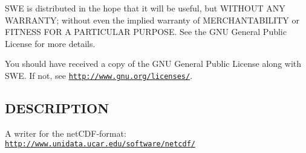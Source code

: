 S\-W\-E is distributed in the hope that it will be useful, but W\-I\-T\-H\-O\-U\-T A\-N\-Y W\-A\-R\-R\-A\-N\-T\-Y; without even the implied warranty of M\-E\-R\-C\-H\-A\-N\-T\-A\-B\-I\-L\-I\-T\-Y or F\-I\-T\-N\-E\-S\-S F\-O\-R A P\-A\-R\-T\-I\-C\-U\-L\-A\-R P\-U\-R\-P\-O\-S\-E. See the G\-N\-U General Public License for more details.

You should have received a copy of the G\-N\-U General Public License along with S\-W\-E. If not, see \href{http://www.gnu.org/licenses/}{\tt http\-://www.\-gnu.\-org/licenses/}.\hypertarget{NetCdfWriter_8hh_DESCRIPTION}{}\subsection{D\-E\-S\-C\-R\-I\-P\-T\-I\-O\-N}\label{NetCdfWriter_8hh_DESCRIPTION}
A writer for the net\-C\-D\-F-\/format\-: \href{http://www.unidata.ucar.edu/software/netcdf/}{\tt http\-://www.\-unidata.\-ucar.\-edu/software/netcdf/} 
